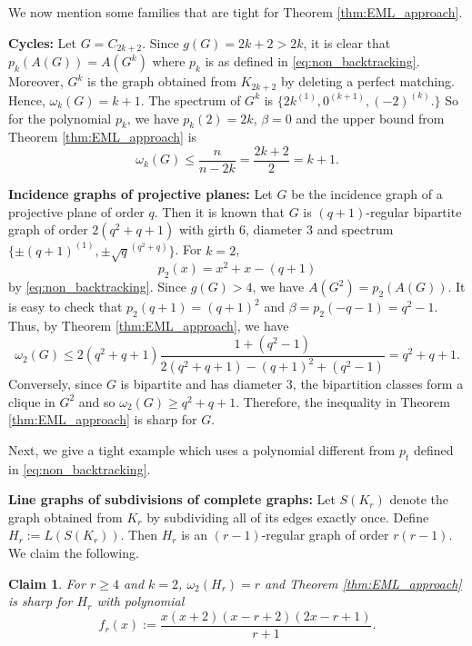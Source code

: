 \documentclass[11pt]{article}
\theoremstyle{plain}
\newtheorem{claim}{Claim}[section]
\numberwithin{equation}{section}
\begin{document}
We now mention some families that are tight for Theorem \ref{thm:EML_approach}. 

\textbf{Cycles:} Let $G = C_{2k+2}$. Since $g(G)=2k+2>2k$, it is clear that $p_k(A(G)) = A(G^k)$ where $p_k$ is as defined in \eqref{eq:non_backtracking}. Moreover, $G^k$ is the graph obtained from $K_{2k+2}$ by deleting a perfect matching. Hence, $\omega_k(G) = k+1$. The spectrum of $G^k$ is $\{2k^{(1)}, 0^{(k+1)}, (-2)^{(k)}.\}$ So for the polynomial $p_k$, we have $p_k(2)=2k$, $\beta = 0$ and the upper bound from Theorem \ref{thm:EML_approach} is 
\[ \omega_k(G)\le \frac{n}{n-2k} = \frac{2k+2}{2} = k+1.\]

\textbf{Incidence graphs of projective planes:} Let $G$ be the incidence graph of a projective plane of order $q$. Then it is known that $G$ is $(q+1)$-regular bipartite graph of order $2(q^2+q+1)$ with girth $6$, diameter $3$ and spectrum $\{\pm  (q+1)^{(1)}, \pm \sqrt{q}^{(q^2+q)}\}$. For $k=2$, \[p_2(x) = x^2 + x - (q+1)\] 
by \eqref{eq:non_backtracking}. Since $g(G)>4$, we have $A(G^2) = p_2(A(G))$. It is easy to check that $p_2(q+1) = (q+1)^2$ and $\beta = p_2(-q-1)= q^2-1$. Thus, by Theorem \ref{thm:EML_approach}, we have 
\[ \omega_2(G)\le 2(q^2+q+1)\frac{1+(q^2-1)}{2(q^2+q+1) - (q+1)^2 + (q^2-1)}= q^2+q+1.\]
Conversely, since $G$ is bipartite and has diameter $3$, the bipartition classes form a clique in $G^2$ and so $\omega_2(G)\ge q^2+q+1$. Therefore, the inequality in Theorem \ref{thm:EML_approach} is sharp for $G$. 

Next, we give a tight example which uses a polynomial different from $p_t$ defined in \eqref{eq:non_backtracking}.

\textbf{Line graphs of subdivisions of complete graphs:} Let $S(K_r)$ denote the graph obtained from $K_r$ by subdividing all of its edges exactly once. Define $H_r:= L(S(K_r))$. Then $H_r$ is an $(r-1)$-regular graph of order $r(r-1)$. We claim the following.

\begin{claim}
For $r\ge 4$ and $k=2$, $\omega_2(H_r) = r$ and Theorem \ref{thm:EML_approach} is sharp for $H_r$ with polynomial 
\[ f_r(x) := \frac{x(x+2)(x-r+2)(2x-r+1)}{r+1}.\]
\end{claim}
\end{document}
